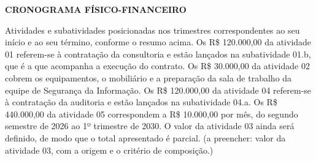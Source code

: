 \documentclass[12pt,a4paper]{article}
\newcommand{\secao}[1]{%
  \par\vspace{\dimexpr16pt-\parskip\relax}%
  {\noindent\bfseries\color{azulTitulo}\fontsize{13}{16}\selectfont #1}%
  \par\vspace{\dimexpr8pt-\parskip\relax}%
}
\begin{document}
%
%
%
%
%
%
\clearpage
\secao{CRONOGRAMA FÍSICO-FINANCEIRO}

Atividades e subatividades posicionadas nos trimestres correspondentes ao seu início e ao seu término, conforme o resumo acima. Os R\$ 120.000,00 da atividade 01 referem-se à contratação da consultoria e estão lançados na subatividade 01.b, que é a que acompanha a execução do contrato. Os R\$ 30.000,00 da atividade 02 cobrem os equipamentos, o mobiliário e a preparação da sala de trabalho da equipe de Segurança da Informação. Os R\$ 120.000,00 da atividade 04 referem-se à contratação da auditoria e estão lançados na subatividade 04.a. Os R\$ 440.000,00 da atividade 05 correspondem a R\$ 10.000,00 por mês, do segundo semestre de 2026 ao 1º trimestre de 2030. O valor da atividade 03 ainda será definido, de modo que o total apresentado é parcial. (a preencher: valor da atividade 03, com a origem e o critério de composição.)
\end{document}
